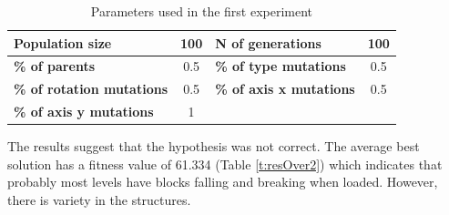 \documentclass[sigconf]{acmart}
\newcommand{\myfloatalign}{\centering} %
\begin{document}

\begin{table}
	\myfloatalign
	\caption{Parameters used in the first experiment} 
	\label{t:base}
	\begin{tabular}{lclc}
		\hline
		\textbf{Population size} & 100 & \textbf{N of generations} & 100\\ \hline
		\textbf{\% of parents} &  0.5 &\textbf{\% of type mutations} & 0.5\\  \hline
		\textbf{\% of rotation mutations} & 0.5 & \textbf{\% of axis x mutations}  & 0.5 \\  \hline
		\textbf{\% of axis y mutations}  & 1 & &\\  \hline
	\end{tabular}
\end{table}


The results suggest that the hypothesis was not correct. The average best 
solution has a fitness value of 61.334 (Table \ref{t:resOver2}) 
which indicates that probably most levels have blocks falling and  
breaking when loaded. However, there is variety in the structures.
\end{document}
